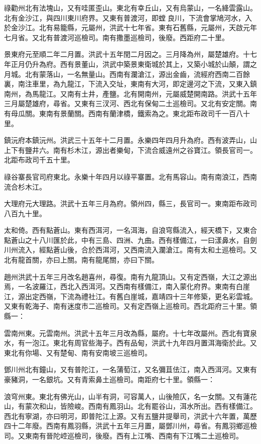 祿勸州北有法塊山，又有哇匿歪山。東北有幸丘山，又有烏蒙山，一名絳雲露山。北有金沙江，與四川東川府界。又東有普渡河，即螳良川，下流會掌鳩河水，入於金沙江。北有易籠縣，元屬州，洪武十七年省。東有石舊縣，元屬州，天啟元年七月省。又北有普渡河巡檢司。南有撒墨巡檢司，後廢。西距府二十里。

景東府元至順二年二月置。洪武十五年閏二月因之。三月降為州，屬楚雄府。十七年正月仍升為府。西有景董山，洪武中築景東衛城於其上，又築小城於山顛，謂之月城。北有蒙落山，一名無量山。西南有瀾滄江，源出金齒，流經府西南二百餘裏，南注車里，為九龍江，下流入交址，東南有大河，即定邊河之下流，又東入鎮南州，為馬龍江。又南有土井，產鹽。北有開南州，元屬威楚開南路。洪武十五年三月屬楚雄府，尋省。又東有三汊河、西北有保甸二土巡檢司。又北有安定關。南有母瓜關。東南有景蘭關。西南有蘭津橋，鐵索為之。東北距布政司千一百八十里。

鎮沅府本鎮沅州。洪武三十五年十二月置。永樂四年四月升為府。西有波弄山，山上下有鹽井六。南有杉木江，源出者樂甸，下流合威遠州之谷寶江。領長官司一。北距布政司千五十里。

祿谷寨長官司府東北。永樂十年四月以祿平寨置。北有馬容山。南有南浪江，西南流合杉木江。

大理府元大理路。洪武十五年三月為府。領州四，縣三，長官司一。東南距布政司八百九十里。

太和倚。西有點蒼山。東有西洱河，一名洱海，自浪穹縣流入，經天橋下，又東合點蒼山之十八川匯於此，中有三島、四洲、九曲。西有樣備江，一曰漾鼻水，自劍川州流入，經點蒼山後，合於西洱河，又西南流入瀾滄江。南有太和土巡檢司。又北有龍首關，亦曰上關。南有龍尾關，亦曰下關。

趙州洪武十五年三月改名趙喜州，尋復。南有九龍頂山。又有定西嶺，大江之源出焉，一名波羅江，西北入西洱河。又西南有樣備江，南入蒙化府界。東南有白崖江，源出定西嶺，下流為禮社江。有舊白崖城，嘉靖四十三年修築，更名彩雲城。又東有乾海子、南有迷度市二巡檢司。又有定西嶺上巡檢司。西北距府三十里。領縣一：

雲南州東。元雲南州。洪武十五年三月改為縣，屬府。十七年改屬州。西北有寶泉水，有一泡江。東北有周官些海子。西有品甸，洪武十九年四月置洱海衛於此。又東北有你場、又有楚甸、南有安南坡三巡檢司。

鄧川州北有鐘山，又有普陀江，一名蒲萄江，又名彌苴佉江，南入西洱河。又東有豪豬洞，一名銀坑。又有青索鼻土巡檢司。南距府七十里。領縣一：

浪穹州東。東北有佛光山，山半有洞，可容萬人，山後險仄，名一女關。又有蓮花山，有蒙次和山，皆險峻。西南有鳳羽山。北有罷谷山，洱水所出。西有樣備江。西北有寧湖，亦曰明河，即普陀江上源。又有五鹽井提舉司，洪武十六年置，萬歷四十二年廢。西南有鳳羽縣，洪武十五年三月置，屬鄧川州，尋省。有鳳羽鄉巡檢司。又東南有晉陀崆巡檢司，後廢。西有上江嘴、西南有下江嘴二土巡檢司。


